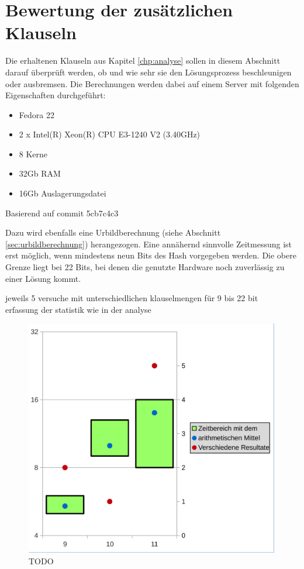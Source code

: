 \chapter{Bewertung der zusätzlichen Klauseln}
\label{chp:bewertung}

Die erhaltenen Klauseln aus Kapitel \ref{chp:analyse} sollen in diesem Abschnitt darauf überprüft werden,
ob und wie sehr sie den Lösungsprozess beschleunigen oder ausbremsen. Die Berechnungen werden dabei auf einem
Server mit folgenden Eigenschaften durchgeführt:
\begin{itemize}
  \item Fedora 22
  \item 2 x Intel(R) Xeon(R) CPU E3-1240 V2 (3.40GHz)
  \item 8 Kerne
  \item 32Gb RAM
  \item 16Gb Auslagerungsdatei
\end{itemize}

Basierend auf commit 5cb7c4c3

Dazu wird ebenfalls eine Urbildberechnung
(siehe Abschnitt \ref{sec:urbildberechnung}) herangezogen. Eine annähernd sinnvolle Zeitmessung ist erst möglich,
wenn mindestens neun Bits des Hash vorgegeben werden. Die obere Grenze liegt bei 22 Bits, bei denen die genutzte
Hardware noch zuverlässig zu einer Lösung kommt. 



jeweils 5 versuche mit unterschiedlichen klauselmengen für 9 bis 22 bit\\
erfassung der statistik wie in der analyse\\

\begin{figure}[!h]
  \centering
  \includegraphics[scale=0.55]{images/data_legend}
  \caption{TODO}
  \label{fig:data_lengede}
\end{figure}


